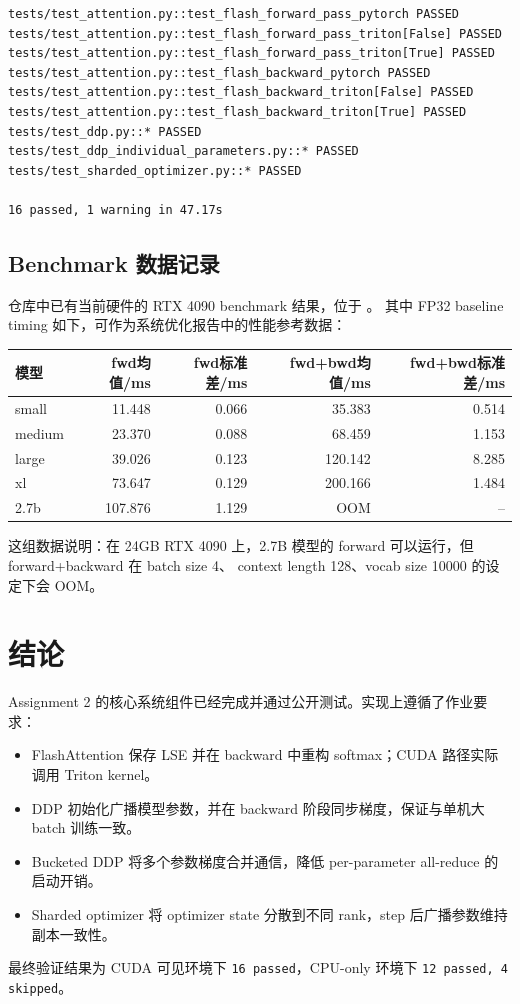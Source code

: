 \documentclass[UTF8,11pt]{ctexart}
\begin{document}
\begin{lstlisting}
tests/test_attention.py::test_flash_forward_pass_pytorch PASSED
tests/test_attention.py::test_flash_forward_pass_triton[False] PASSED
tests/test_attention.py::test_flash_forward_pass_triton[True] PASSED
tests/test_attention.py::test_flash_backward_pytorch PASSED
tests/test_attention.py::test_flash_backward_triton[False] PASSED
tests/test_attention.py::test_flash_backward_triton[True] PASSED
tests/test_ddp.py::* PASSED
tests/test_ddp_individual_parameters.py::* PASSED
tests/test_sharded_optimizer.py::* PASSED

16 passed, 1 warning in 47.17s
\end{lstlisting}

\subsection{Benchmark 数据记录}

仓库中已有当前硬件的 RTX 4090 benchmark 结果，位于
。
其中 FP32 baseline timing 如下，可作为系统优化报告中的性能参考数据：

\begin{longtable}{lrrrr}
\toprule
模型 & fwd均值/ms & fwd标准差/ms & fwd+bwd均值/ms & fwd+bwd标准差/ms \\
\midrule
small & 11.448 & 0.066 & 35.383 & 0.514 \\
medium & 23.370 & 0.088 & 68.459 & 1.153 \\
large & 39.026 & 0.123 & 120.142 & 8.285 \\
xl & 73.647 & 0.129 & 200.166 & 1.484 \\
2.7b & 107.876 & 1.129 & OOM & -- \\
\bottomrule
\end{longtable}

这组数据说明：在 24GB RTX 4090 上，2.7B 模型的 forward 可以运行，但 forward+backward 在 batch size 4、
context length 128、vocab size 10000 的设定下会 OOM。

\section{结论}

Assignment 2 的核心系统组件已经完成并通过公开测试。实现上遵循了作业要求：

\begin{itemize}
  \item FlashAttention 保存 LSE 并在 backward 中重构 softmax；CUDA 路径实际调用 Triton kernel。
  \item DDP 初始化广播模型参数，并在 backward 阶段同步梯度，保证与单机大 batch 训练一致。
  \item Bucketed DDP 将多个参数梯度合并通信，降低 per-parameter all-reduce 的启动开销。
  \item Sharded optimizer 将 optimizer state 分散到不同 rank，step 后广播参数维持副本一致性。
\end{itemize}

最终验证结果为 CUDA 可见环境下 \texttt{16 passed}，CPU-only 环境下 \texttt{12 passed, 4 skipped}。
\end{document}
